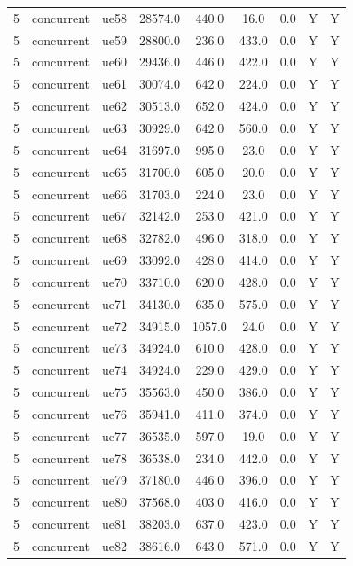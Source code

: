 \begin{table}[ht]
\begin{tabular}{|c|c|c|c|c|c|c|c|c|}
5 & concurrent & ue58 & 28574.0 & 440.0 & 16.0 & 0.0 & Y & Y \\
5 & concurrent & ue59 & 28800.0 & 236.0 & 433.0 & 0.0 & Y & Y \\
5 & concurrent & ue60 & 29436.0 & 446.0 & 422.0 & 0.0 & Y & Y \\
5 & concurrent & ue61 & 30074.0 & 642.0 & 224.0 & 0.0 & Y & Y \\
5 & concurrent & ue62 & 30513.0 & 652.0 & 424.0 & 0.0 & Y & Y \\
5 & concurrent & ue63 & 30929.0 & 642.0 & 560.0 & 0.0 & Y & Y \\
5 & concurrent & ue64 & 31697.0 & 995.0 & 23.0 & 0.0 & Y & Y \\
5 & concurrent & ue65 & 31700.0 & 605.0 & 20.0 & 0.0 & Y & Y \\
5 & concurrent & ue66 & 31703.0 & 224.0 & 23.0 & 0.0 & Y & Y \\
5 & concurrent & ue67 & 32142.0 & 253.0 & 421.0 & 0.0 & Y & Y \\
5 & concurrent & ue68 & 32782.0 & 496.0 & 318.0 & 0.0 & Y & Y \\
5 & concurrent & ue69 & 33092.0 & 428.0 & 414.0 & 0.0 & Y & Y \\
5 & concurrent & ue70 & 33710.0 & 620.0 & 428.0 & 0.0 & Y & Y \\
5 & concurrent & ue71 & 34130.0 & 635.0 & 575.0 & 0.0 & Y & Y \\
5 & concurrent & ue72 & 34915.0 & 1057.0 & 24.0 & 0.0 & Y & Y \\
5 & concurrent & ue73 & 34924.0 & 610.0 & 428.0 & 0.0 & Y & Y \\
5 & concurrent & ue74 & 34924.0 & 229.0 & 429.0 & 0.0 & Y & Y \\
5 & concurrent & ue75 & 35563.0 & 450.0 & 386.0 & 0.0 & Y & Y \\
5 & concurrent & ue76 & 35941.0 & 411.0 & 374.0 & 0.0 & Y & Y \\
5 & concurrent & ue77 & 36535.0 & 597.0 & 19.0 & 0.0 & Y & Y \\
5 & concurrent & ue78 & 36538.0 & 234.0 & 442.0 & 0.0 & Y & Y \\
5 & concurrent & ue79 & 37180.0 & 446.0 & 396.0 & 0.0 & Y & Y \\
5 & concurrent & ue80 & 37568.0 & 403.0 & 416.0 & 0.0 & Y & Y \\
5 & concurrent & ue81 & 38203.0 & 637.0 & 423.0 & 0.0 & Y & Y \\
5 & concurrent & ue82 & 38616.0 & 643.0 & 571.0 & 0.0 & Y & Y \\

\end{tabular}
\end{table}
